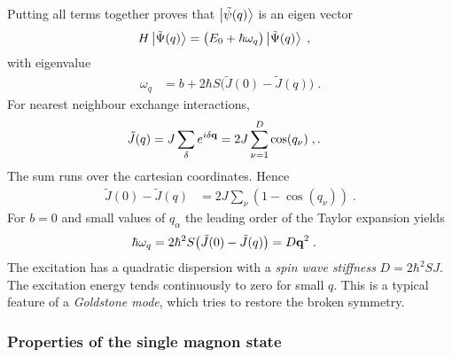 %
Putting all terms together proves that $\ket{\tilde \psi(q)}$ is an eigen vector 
%
\begin{align}
H \ket{\tilde \Psi(q) } &= \big(E_{0}+\hbar \omega_{q}  \big)
\ket{\tilde \Psi(q) }\;,
\end{align}
%
with eigenvalue 
%
\begin{align}\label{eq:}
 \omega_{q}&= b + 2   \hbar S \big( \tilde J(0)- \tilde J(q) \big) \;.
\end{align}
%
For nearest neighbour exchange interactions, 
%
\begin{align*}
\tilde J(q) &= J \sum_{\mathbf \delta}  e^{i \mathbf \delta \mathbf q} 
=	2 J \sum_{\nu=1}^{D}	 \cos(q_{\nu})\;,.
\end{align*}
% 
The sum runs over the cartesian coordinates.
Hence
%
\begin{align*}
\tilde J(0) - \tilde J(q) &= 2 J \sum_{\nu} (1-\cos(q_{\nu}))\;.
\end{align*}
%
For $b=0$ and small values of $q_{\alpha}$ the leading order of the  Taylor expansion yields
%
\begin{align*}
\hbar \omega_{q}&=2\hbar^{2} S \big(\tilde J(0) - \tilde J(q) \big)= D \mathbf q^{2}\;.
\end{align*}
%
The excitation has a quadratic dispersion with  a {\em spin wave stiffness} $D = 2\hbar^{2} S J$. The excitation energy tends 
continuously to zero for small $q$. This is a typical feature of a {\em Goldstone mode}, which tries to restore the broken symmetry.

\subsubsection{Properties of the single magnon state}

